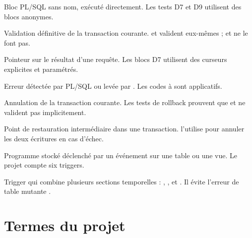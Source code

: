 \begin{description}[leftmargin=2.6em,style=nextline]

\item[Bloc anonyme.]
Bloc PL/SQL sans nom, exécuté directement. Les tests D7 et D9 utilisent des
blocs anonymes.

\item[COMMIT.]
Validation définitive de la transaction courante.  et
 valident eux-mêmes ;  et  ne
le font pas.

\item[Curseur.]
Pointeur sur le résultat d'une requête. Les blocs D7 utilisent des curseurs
explicites et paramétrés.

\item[Exception.]
Erreur détectée par PL/SQL ou levée par . Les
codes  à  sont applicatifs.

\item[ROLLBACK.]
Annulation de la transaction courante. Les tests de rollback prouvent que
 et  ne valident pas implicitement.

\item[SAVEPOINT.]
Point de restauration intermédiaire dans une transaction. 
l'utilise pour annuler les deux écritures en cas d'échec.

\item[Trigger.]
Programme stocké déclenché par un événement sur une table ou une vue. Le projet
compte six triggers.

\item[Trigger COMPOUND.]
Trigger qui combine plusieurs sections temporelles :
, ,  et
. Il évite l'erreur de table mutante
.

\end{description}

\section{Termes du projet}


